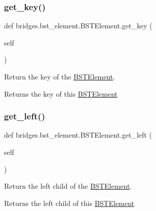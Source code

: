 \subsubsection{\texorpdfstring{get\+\_\+key()}{get\_key()}}
{\footnotesize\ttfamily def bridges.\+bst\+\_\+element.\+B\+S\+T\+Element.\+get\+\_\+key (\begin{DoxyParamCaption}\item[{}]{self }\end{DoxyParamCaption})}



Return the key of the \mbox{\hyperlink{classbridges_1_1bst__element_1_1_b_s_t_element}{B\+S\+T\+Element}}. 

\begin{DoxyReturn}{Returns}
the key of this \mbox{\hyperlink{classbridges_1_1bst__element_1_1_b_s_t_element}{B\+S\+T\+Element}} 
\end{DoxyReturn}
\mbox{\label{classbridges_1_1bst__element_1_1_b_s_t_element_a3f5220af41a00cc6d24d0c592caabbb0}} 
\subsubsection{\texorpdfstring{get\+\_\+left()}{get\_left()}}
{\footnotesize\ttfamily def bridges.\+bst\+\_\+element.\+B\+S\+T\+Element.\+get\+\_\+left (\begin{DoxyParamCaption}\item[{}]{self }\end{DoxyParamCaption})}



Return the left child of the \mbox{\hyperlink{classbridges_1_1bst__element_1_1_b_s_t_element}{B\+S\+T\+Element}}. 

\begin{DoxyReturn}{Returns}
the left child of this \mbox{\hyperlink{classbridges_1_1bst__element_1_1_b_s_t_element}{B\+S\+T\+Element}} 
\end{DoxyReturn}
\mbox{\label{classbridges_1_1bst__element_1_1_b_s_t_element_a63873a4e910831c2581658847d14836c}} 
